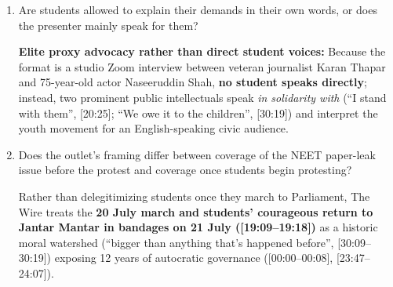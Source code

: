 \documentclass[10pt,a4paper]{article}
\begin{document}
{\begin{enumerate}[leftmargin=1.5em, itemsep=6pt, topsep=4pt]
  Police/state attackers are described as ``sadistically beating up these students'' ([07:15]), ``let loose an army of goons on our future'' ([07:42]), ``splitting young children's heads open, women being attacked and molested'' ([08:38--08:47]), and firing guns reminiscent of ``Jallianwala Bagh'' ([10:48--11:08]). When discussing \textbf{police casualties}, Shah openly mocks official injury figures (``supposedly more policemen injured than students... astounding... something like 600 policemen and about 60 students'', [06:49--07:07]) and justifies student pushback via a cornered-victim proverb: ``the students retaliating. It's not surprising. I mean, even a rat fights back when it's pushed against the wall. And these kids are justified'' ([09:36--09:46]).
  \item Are students allowed to explain their demands in their own words, or does the presenter mainly speak for them?\par\smallskip
  \textbf{Elite proxy advocacy rather than direct student voices:} Because the format is a studio Zoom interview between veteran journalist Karan Thapar and 75-year-old actor Naseeruddin Shah, \textbf{no student speaks directly}; instead, two prominent public intellectuals speak \emph{in solidarity with} (``I stand with them'', [20:25]; ``We owe it to the children'', [30:19]) and interpret the youth movement for an English-speaking civic audience.
  \item Does the outlet's framing differ between coverage of the NEET paper-leak issue before the protest and coverage once students begin protesting?\par\smallskip
  Rather than delegitimizing students once they march to Parliament, The Wire treats the \textbf{20 July march and students' courageous return to Jantar Mantar in bandages on 21 July ([19:09--19:18])} as a historic moral watershed (``bigger than anything that's happened before'', [30:09--30:19]) exposing 12 years of autocratic governance ([00:00--00:08], [23:47--24:07]).
\end{enumerate}
}
\end{document}
